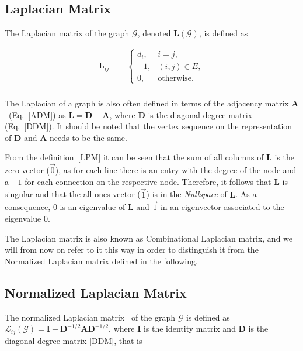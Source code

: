 \documentclass[conference,fleqn]{IEEEtran}
\begin{document}
\subsection{Laplacian Matrix}
\label{subsec:Lap}
The Laplacian matrix of the graph $\mathcal{G}$, denoted $\mathbf{L}(\mathcal{G})$, is
defined as

\begin{equation}
\label{LPM}
\begin{split}
	\mathbf{L}_{ij} =&
	\begin{cases}
		d_i, & i = j,\\
		-1,  & (i,j) \in E,\\
		0,   & \text{otherwise.}
	\end{cases}\\
\end{split}
\end{equation}

The Laplacian of a graph is also often defined in terms of the adjacency matrix 
$\mathbf{A}$~(Eq.~\eqref{ADM}) as $\mathbf{L} = \mathbf{D} - \mathbf{A}$,
where $\mathbf{D}$ is the diagonal degree matrix (Eq.~\eqref{DDM}). It should be noted 
that the vertex sequence on the representation of $\mathbf{D}$ and $\mathbf{A}$ needs 
to be the same.
 
From the definition~\eqref{LPM} it can be seen that the sum of all columns of $\mathbf{L}$ 
is the zero vector ($\vec{0}$), as for each line there is an entry with the degree of the node 
and a $-1$ for each connection on the respective node. Therefore, it follows that $\mathbf{L}$ is 
singular and that the all ones vector ($\vec{1}$) is in the \textit{Nullspace} of $\mathbf{L}$.
As a consequence, 0 is an eigenvalue of $\mathbf{L}$ and $\vec{1}$ in an eigenvector 
associated to the eigenvalue 0.



The Laplacian matrix is also known as Combinational Laplacian matrix, and we will from now on refer to it 
this way in order to distinguish it from the Normalized Laplacian matrix defined in the following.

\subsection{Normalized Laplacian Matrix}
\label{subsec:NormLap}
The normalized Laplacian matrix~\cite{Chung1996} of the graph $\mathcal{G}$ 
is defined as $\mathcal{L}_{ij}(\mathcal{G}) =
\mathbf{I} - \mathbf{D}^{-1/2}\mathbf{A}\mathbf{D}^{-1/2}$,
where $\mathbf{I}$ is the identity matrix and $\mathbf{D}$ is the diagonal degree matrix \eqref{DDM}, that is
\end{document}
